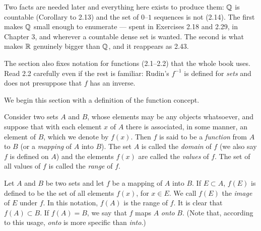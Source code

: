 
\begin{signpost}
Two facts are needed later and everything here exists to produce them: $\mathbb{Q}$ is
countable (Corollary to 2.13) and the set of $0$--$1$ sequences is not (2.14).
The first makes $\mathbb{Q}$ small enough to enumerate --- spent in Exercises 2.18 and
2.29, in Chapter 3, and wherever a countable dense set is wanted. The second is what makes $\mathbb{R}$
genuinely bigger than $\mathbb{Q}$, and it reappears as 2.43.

\smallskip
The section also fixes notation for functions (2.1--2.2) that the whole book
uses. Read 2.2 carefully even if the rest is familiar: Rudin's $f^{-1}$ is
defined for \emph{sets} and does not presuppose that $f$ has an inverse.
\end{signpost}

\noindent
We begin this section with a definition of the function concept.

Consider two sets $A$ and $B$, whose elements may be any objects whatsoever,
and suppose that with each element $x$ of $A$ there is associated, in some
manner, an element of $B$, which we denote by $f(x)$. Then $f$ is said to be a
\emph{function} from $A$ to $B$ (or a \emph{mapping} of $A$ into $B$). The set
$A$ is called the \emph{domain} of $f$ (we also say $f$ is defined on $A$) and
the elements $f(x)$ are called the \emph{values} of $f$. The set of all values
of $f$ is called the \emph{range} of $f$.

Let $A$ and $B$ be two sets and let $f$ be a mapping of $A$ into $B$. If
$E \subset A$, $f(E)$ is defined to be the set of all elements $f(x)$, for
$x \in E$. We call $f(E)$ the \emph{image} of $E$ under $f$. In this notation,
$f(A)$ is the range of $f$. It is clear that $f(A) \subset B$. If $f(A) = B$, we
say that $f$ maps $A$ \emph{onto} $B$. (Note that, according to this usage,
\emph{onto} is more specific than \emph{into}.)

